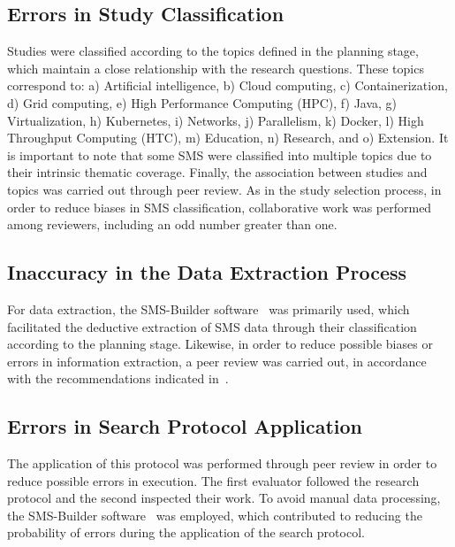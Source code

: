 \subsection{Errors in Study Classification}
Studies were classified according to the topics defined in the planning stage, which maintain a close relationship with the research questions.
These topics correspond to: a) Artificial intelligence, b) Cloud computing, c) Containerization, d) Grid computing, e) High Performance Computing (HPC), f) Java, g) Virtualization, h) Kubernetes, i) Networks, j) Parallelism, k) Docker, l) High Throughput Computing (HTC), m) Education, n) Research, and o) Extension.
It is important to note that some SMS were classified into multiple topics due to their intrinsic thematic coverage. Finally, the association between studies and topics was carried out through peer review. As in the study selection process, in order to reduce biases in SMS classification, collaborative work was performed among reviewers, including an odd number greater than one.

\subsection{Inaccuracy in the Data Extraction Process}
For data extraction, the SMS-Builder software~\cite{sms-builder-repo} was primarily used, which facilitated the deductive extraction of SMS data through their classification according to the planning stage. Likewise, in order to reduce possible biases or errors in information extraction, a peer review was carried out, in accordance with the recommendations indicated in~\cite{Kitchenham2010792}.

\subsection{Errors in Search Protocol Application}
The application of this protocol was performed through peer review in order to reduce possible errors in execution. The first evaluator followed the research protocol and the second inspected their work. To avoid manual data processing, the SMS-Builder software~\cite{sms-builder-repo} was employed, which contributed to reducing the probability of errors during the application of the search protocol.
